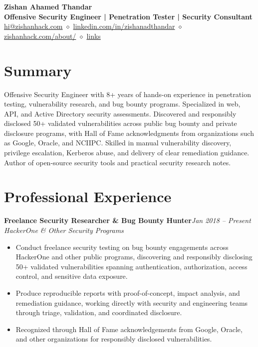 \documentclass[10pt,a4paper]{article}
\newcommand{\resumeEntry}[4]{
    \textbf{#1}\hfill \textit{#2}\\
    \textit{#3}\hfill #4
    \vspace{1pt}
}
\begin{document}
\begin{center}
    {\LARGE\bfseries Zishan Ahamed Thandar}\\[3pt]
    \textbf{Offensive Security Engineer | Penetration Tester | Security Consultant}\\[4pt]
    \href{mailto:hi@zishanhack.com}{hi@zishanhack.com}
    \quad$\diamond$\quad
    \href{https://www.linkedin.com/in/zishanadthandar/}{linkedin.com/in/zishanadthandar}
    \quad$\diamond$\quad
    \href{https://zishanhack.com/about/}{zishanhack.com/about/}
    \quad$\diamond$\quad
    \href{https://zishanhack.com/links/}{links}
\end{center}

\section{Summary}

Offensive Security Engineer with 8+ years of hands-on experience in penetration testing, vulnerability research, and bug bounty programs. Specialized in web, API, and Active Directory security assessments. Discovered and responsibly disclosed 50+ validated vulnerabilities across public bug bounty and private disclosure programs, with Hall of Fame acknowledgments from organizations such as Google, Oracle, and NCIIPC. Skilled in manual vulnerability discovery, privilege escalation, Kerberos abuse, and delivery of clear remediation guidance. Author of open-source security tools and practical security research notes.

\section{Professional Experience}

\resumeEntry{Freelance Security Researcher \& Bug Bounty Hunter}{Jan 2018 -- Present}{HackerOne \& Other Security Programs}{}
\begin{itemize}
    \item Conduct freelance security testing on bug bounty engagements across HackerOne and other public programs, discovering and responsibly disclosing 50+ validated vulnerabilities spanning authentication, authorization, access control, and sensitive data exposure.
    \item Produce reproducible reports with proof-of-concept, impact analysis, and remediation guidance, working directly with security and engineering teams through triage, validation, and coordinated disclosure.
    \item Recognized through Hall of Fame acknowledgements from Google, Oracle, and other organizations for responsibly disclosed vulnerabilities.
\end{itemize}
\end{document}
